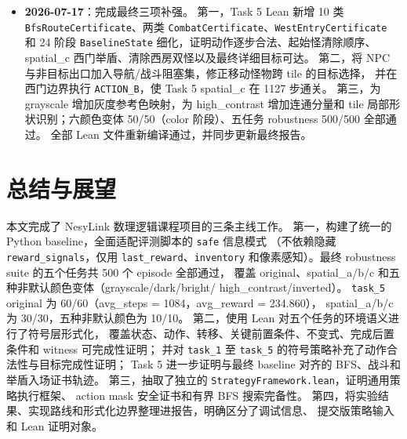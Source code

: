 \documentclass[12pt,a4paper]{ctexart}
\begin{document}
\begin{itemize}[leftmargin=2em]
  发现引擎 \texttt{try\_interaction} 在战斗前检查 NPC/chest 邻接（无 facing 检查），
  导致 spatial\_b 中 agent 站在 NPC 邻接 tile 按下 A 时触发 \texttt{talked\_npc}
  而非攻击怪物。新增 \texttt{compute\_no\_attack\_tiles} 方法检测所有 NPC/chest
  邻接 tile，\texttt{attack\_monster} 接受 \texttt{no\_attack\_tiles} 参数
  在不安全 tile 上回退到 BFS 寻找安全攻击位置。
  同时新增 \texttt{diagonal\_block} 参数：start 房间保持 \texttt{True}
  （spatial\_a 修复：对角 tile 加入 blocked 避免 AABB 接触伤害），
  west 房间设为 \texttt{False}（spatial\_b 修复：避免 60+ 步绕行）。
  修复后 spatial\_a（5/5，steps=1076）和 spatial\_b（5/5，steps=1174）均以 HP = 1 通关，
  original 无回归（18/18，steps=1083），color 变体无回归（3/5）。
  spatial\_c 因 south 房间导航效率过低（299 次 blocked）仍失败。
  同步更新报告结果表格、spatial 变体小节与优化历程。
  \item \textbf{2026-07-17}：完成最终三项补强。
  第一，Task 5 Lean 新增 10 类 \texttt{BfsRouteCertificate}、两类
  \texttt{CombatCertificate}、\texttt{WestEntryCertificate} 和 24 阶段
  \texttt{BaselineState} 细化，证明动作逐步合法、起始怪清除顺序、
  spatial\_c 西门举盾、清除西房双怪以及最终详细目标可达。
  第二，将 NPC 与非目标出口加入导航/战斗阻塞集，修正移动怪物跨 tile 的目标选择，
  并在西门边界执行 \texttt{ACTION\_B}，使 Task 5 spatial\_c 在 1127 步通关。
  第三，为 grayscale 增加灰度参考色映射，为 high\_contrast 增加连通分量和
  tile 局部形状识别；六颜色变体 50/50（color 阶段）、五任务 robustness 500/500 全部通过。
  全部 Lean 文件重新编译通过，并同步更新最终报告。
\end{itemize}

\section{总结与展望}

本文完成了 NesyLink 数理逻辑课程项目的三条主线工作。
第一，构建了统一的 Python baseline，全面适配评测脚本的 \texttt{safe} 信息模式
（不依赖隐藏 \texttt{reward\_signals}，仅用 \texttt{last\_reward}、\texttt{inventory}
和像素感知）。最终 robustness suite 的五个任务共 500 个 episode 全部通过，
覆盖 original、spatial\_a/b/c 和五种非默认颜色变体（grayscale/dark/bright/
high\_contrast/inverted）。
\texttt{task\_5} original 为 60/60（avg\_steps = 1084，avg\_reward = 234.860），
spatial\_a/b/c 为 30/30，五种非默认颜色为 10/10。
第二，使用 Lean 对五个任务的环境语义进行了符号层形式化，
覆盖状态、动作、转移、关键前置条件、不变式、完成后置条件和 witness 可完成性证明；
并对 \texttt{task\_1} 至 \texttt{task\_5} 的符号策略补充了动作合法性与目标完成性证明；
Task 5 进一步证明与最终 baseline 对齐的 BFS、战斗和举盾入场证书轨迹。
第三，抽取了独立的 \texttt{StrategyFramework.lean}，证明通用策略执行框架、
action mask 安全证书和有界 BFS 搜索完备性。
第四，将实验结果、实现路线和形式化边界整理进报告，明确区分了调试信息、
提交版策略输入和 Lean 证明对象。
\end{document}
